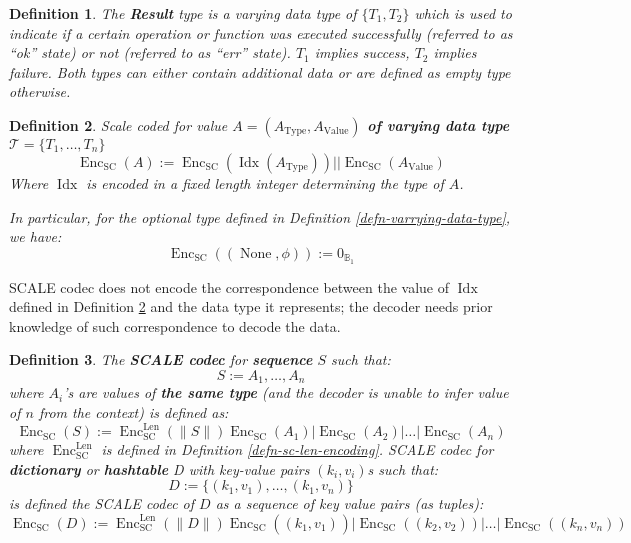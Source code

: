 \documentclass{book}
\newcommand{\assign}{:=}
\newcommand{\tmop}[1]{\ensuremath{\operatorname{#1}}}
\newcommand{\tmstrong}[1]{\textbf{#1}}
\newcommand{\tmtextbf}[1]{{\bfseries{#1}}}
\newtheorem{definition}{Definition}
\providecommand{\tmop}[1]{\ensuremath{\mathrm{#1}}}
\providecommand{\tmstrong}[1]{\tmtextbf{#1}}
\providecommand{\tmtextbf}[1]{\tmtextbf{#1}}
\newtheorem{definition}{Definition}
\begin{document}
\begin{definition}
  \label{defn-result-type}The {\tmstrong{Result}} type is a varying data type
  of $\{ T_1, T_2 \}$ which is used to indicate if a certain operation or
  function was executed successfully (referred to as ``ok'' state) or not
  (referred to as ``err'' state). $T_1$ implies success, $T_2$ implies
  failure. Both types can either contain additional data or are defined as
  empty type otherwise.
\end{definition}

\begin{definition}
  \label{defn-scale-variable-type}Scale coded for value {\tmstrong{$A =
  (A_{\tmop{Type}}, A_{\tmop{Value}})$ of varying data type}} $\mathcal{T}= \{
  T_1, \ldots, T_n \}$
  \[ \tmop{Enc}_{\tmop{SC}} (A) \assign \tmop{Enc}_{\tmop{SC}} (\tmop{Idx}
     (A_{\tmop{Type}})) | | \tmop{Enc}_{\tmop{SC}} (A_{\tmop{Value}}) \]
  Where $\tmop{Idx}$ is encoded in a fixed length integer determining the type
  of $A$.
  
  In particular, for the optional type defined in Definition
  \ref{defn-varrying-data-type}, we have:
  \[ \tmop{Enc}_{\tmop{SC}} ((\tmop{None}, \phi)) \assign 0_{\mathbb{B}_1} \]
\end{definition}

SCALE codec does not encode the correspondence between the value of
$\tmop{Idx}$ defined in Definition \ref{defn-scale-variable-type} and the data
type it represents; the decoder needs prior knowledge of such correspondence
to decode the data.

\begin{definition}
  \label{defn-scale-list}The {\tmstrong{SCALE codec}} for
  {\tmstrong{sequence}} $S$ such that:
  \[ S \assign A_1, \ldots, A_n \]
  where $A_i$'s are values of {\tmstrong{the same type}} (and the decoder is
  unable to infer value of $n$ from the context) is defined as:
  \[ \tmop{Enc}_{\tmop{SC}} (S) \assign \tmop{Enc}^{\tmop{Len}}_{\tmop{SC}}
     (\| S \|) \tmop{Enc}_{\tmop{SC}} (A_1) | \tmop{Enc}_{\tmop{SC}} (A_2) |
     \ldots | \tmop{Enc}_{\tmop{SC}} (A_n) \]
  where $\tmop{Enc}_{\tmop{SC}}^{\tmop{Len}}$ is defined in Definition
  \ref{defn-sc-len-encoding}. SCALE codec for {\tmstrong{dictionary}} or
  {\tmstrong{hashtable}} D with key-value pairs $(k_i, v_i)$s such that:
  \[ D \assign \{ (k_1, v_1), \ldots, (k_1, v_n) \} \]
  is defined the SCALE codec of $D$ as a sequence of key value pairs (as
  tuples):
  \[ \tmop{Enc}_{\tmop{SC}} (D) \assign \tmop{Enc}^{\tmop{Len}}_{\tmop{SC}}
     (\| D \|) \tmop{Enc}_{\tmop{SC}} ((k_1, v_1)_{}) | \tmop{Enc}_{\tmop{SC}}
     ((k_2, v_2)) | \ldots | \tmop{Enc}_{\tmop{SC}} ((k_n, v_n)) \]
  \[ \  \]
\end{definition}
\end{document}
